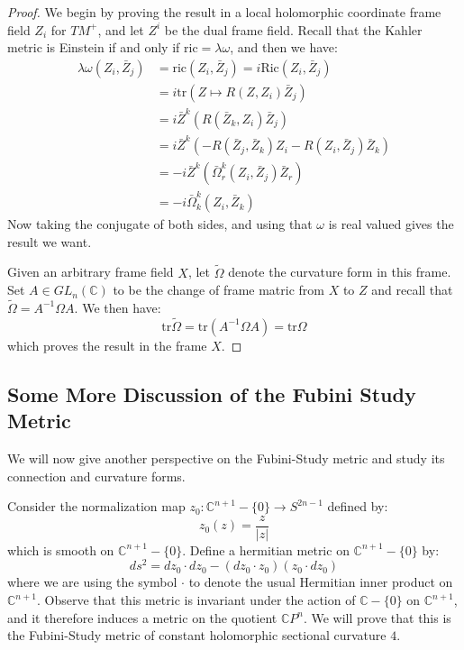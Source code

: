 \documentclass[11pt]{amsart}
\theoremstyle{definition}
\def \CP{ \mathbb{C}P }
\def \C{ \mathbb{C} }
\def \Ric{ \text{Ric} }
\def \tr{ \text{tr} }
\def \ric{ \text{ric} }
\begin{document}
\begin{proof}
We begin by proving the result in a local holomorphic coordinate frame field $Z_i$ for $TM^{+}$, and let $Z^i$ be the dual frame field.  Recall that the Kahler metric is Einstein if and only if $\ric = \lambda \omega$, and then we have:
%
\begin{align*}
\lambda \omega( Z_i, \bar{Z}_j ) &= \ric ( Z_i, \bar{Z}_j ) = i \Ric( Z_i, \bar{Z}_j ) \\
&= i  \tr ( Z \mapsto R( Z, Z_i ) \bar{Z}_j ) \\
&= i \bar{Z}^k ( R( \bar{Z}_k, Z_i ) \bar{Z}_j ) \\
&= i \bar{Z}^k ( - R( \bar{Z}_j, \bar{Z}_k ) Z_i - R( Z_i, \bar{Z}_j ) \bar{Z}_k ) \\
&= - i \bar{Z}^k ( \bar{\Omega}^k_r ( Z_i, \bar{Z}_j ) \bar{Z}_r ) \\
&= - i \bar{\Omega}^k_k ( Z_i, \bar{Z}_k )
\end{align*}
%
Now taking the conjugate of both sides, and using that $\omega$ is real valued gives the result we want.

Given an arbitrary frame field $X$, let $\tilde{ \Omega }$ denote the curvature form in this frame.  Set $A \in GL_n( \C )$ to be the change of frame matric from $X$ to $Z$ and recall that $\tilde{ \Omega } = A^{-1} \Omega A$.  We then have:
%
$$ \tr \tilde{ \Omega } = \tr ( A^{-1} \Omega A ) = \tr \Omega $$
%
which proves the result in the frame $X$.
%
\end{proof} 

\subsection{ Some More Discussion of the Fubini Study Metric }

We will now give another perspective on the Fubini-Study metric and study its connection and curvature forms.

Consider the normalization map $z_0 : \C^{n+1} - \{0\} \rightarrow S^{2n-1}$ defined by:
%
$$ z_0(z) = \frac{z}{|z|} $$
%
which is smooth on $\C^{n+1} - \{0\}$.  Define a hermitian metric on $\C^{n+1} - \{0\}$ by:
%
$$ds^2 = d z_0 \cdot d z_0 - ( d z_0 \cdot z_0 )( z_0 \cdot d z_0 ) $$
%
where we are using the symbol $\cdot$ to denote the usual Hermitian inner product on $\C^{n+1}$.  Observe that this metric is invariant under the action of $\C - \{0\}$ on $\C^{n+1}$, and it therefore induces a metric on the quotient $\CP^{n}$.  We will prove that this is the Fubini-Study metric of constant holomorphic sectional curvature $4$.
\end{document}
